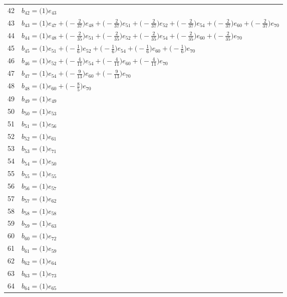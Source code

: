 \begin{longtable}{@{}rP{.82\linewidth}@{}}
42 & $b_{42}=\bigl(1\bigr)e_{43}$\\
43 & $b_{43}=\bigl(1\bigr)e_{47}+\allowbreak \bigl(-\frac{2}{37}\bigr)e_{48}+\allowbreak \bigl(-\frac{2}{37}\bigr)e_{51}+\allowbreak \bigl(-\frac{2}{37}\bigr)e_{52}+\allowbreak \bigl(-\frac{2}{37}\bigr)e_{54}+\allowbreak \bigl(-\frac{2}{37}\bigr)e_{60}+\allowbreak \bigl(-\frac{2}{37}\bigr)e_{70}$\\
44 & $b_{44}=\bigl(1\bigr)e_{48}+\allowbreak \bigl(-\frac{2}{35}\bigr)e_{51}+\allowbreak \bigl(-\frac{2}{35}\bigr)e_{52}+\allowbreak \bigl(-\frac{2}{35}\bigr)e_{54}+\allowbreak \bigl(-\frac{2}{35}\bigr)e_{60}+\allowbreak \bigl(-\frac{2}{35}\bigr)e_{70}$\\
45 & $b_{45}=\bigl(1\bigr)e_{51}+\allowbreak \bigl(-\frac{1}{6}\bigr)e_{52}+\allowbreak \bigl(-\frac{1}{6}\bigr)e_{54}+\allowbreak \bigl(-\frac{1}{6}\bigr)e_{60}+\allowbreak \bigl(-\frac{1}{6}\bigr)e_{70}$\\
46 & $b_{46}=\bigl(1\bigr)e_{52}+\allowbreak \bigl(-\frac{4}{11}\bigr)e_{54}+\allowbreak \bigl(-\frac{4}{11}\bigr)e_{60}+\allowbreak \bigl(-\frac{4}{11}\bigr)e_{70}$\\
47 & $b_{47}=\bigl(1\bigr)e_{54}+\allowbreak \bigl(-\frac{9}{13}\bigr)e_{60}+\allowbreak \bigl(-\frac{9}{13}\bigr)e_{70}$\\
48 & $b_{48}=\bigl(1\bigr)e_{60}+\allowbreak \bigl(-\frac{8}{5}\bigr)e_{70}$\\
49 & $b_{49}=\bigl(1\bigr)e_{49}$\\
50 & $b_{50}=\bigl(1\bigr)e_{53}$\\
51 & $b_{51}=\bigl(1\bigr)e_{56}$\\
52 & $b_{52}=\bigl(1\bigr)e_{61}$\\
53 & $b_{53}=\bigl(1\bigr)e_{71}$\\
54 & $b_{54}=\bigl(1\bigr)e_{50}$\\
55 & $b_{55}=\bigl(1\bigr)e_{55}$\\
56 & $b_{56}=\bigl(1\bigr)e_{57}$\\
57 & $b_{57}=\bigl(1\bigr)e_{62}$\\
58 & $b_{58}=\bigl(1\bigr)e_{58}$\\
59 & $b_{59}=\bigl(1\bigr)e_{63}$\\
60 & $b_{60}=\bigl(1\bigr)e_{72}$\\
61 & $b_{61}=\bigl(1\bigr)e_{59}$\\
62 & $b_{62}=\bigl(1\bigr)e_{64}$\\
63 & $b_{63}=\bigl(1\bigr)e_{73}$\\
64 & $b_{64}=\bigl(1\bigr)e_{65}$\\

\end{longtable}
